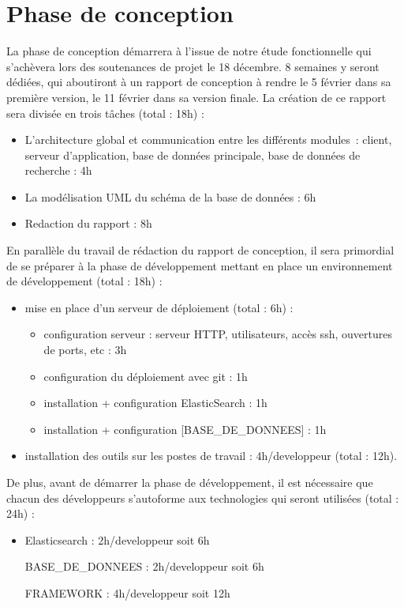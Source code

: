 \section{Phase de conception}

	La phase de conception démarrera à l'issue de notre étude fonctionnelle qui s'achèvera lors des soutenances de projet le 18 décembre.  8 semaines y seront dédiées, qui aboutiront à un rapport de conception à rendre le 5 février dans sa première version, le 11 février dans sa version finale. La création de ce rapport sera divisée en trois tâches (total : 18h) :
\begin{itemize}
\item L'architecture global et communication entre les différents modules : client, serveur d'application, base de données principale, base de données de recherche : 4h
\item La modélisation UML du schéma de la base de données : 6h
\item Redaction du rapport : 8h
\end{itemize}

	En parallèle du travail de rédaction du rapport de conception, il sera primordial de se préparer à la phase de développement mettant en place un environnement de développement (total : 18h) :
\begin{itemize}
\item mise en place d'un serveur de déploiement (total : 6h) :
	\begin{itemize}
	\item configuration serveur : serveur HTTP, utilisateurs, accès ssh, ouvertures de ports, etc : 3h
	\item configuration du déploiement avec git : 1h
	\item installation + configuration ElasticSearch : 1h
	\item installation + configuration [BASE_DE_DONNEES] : 1h
	\end{itemize}
\item installation des outils sur les postes de travail : 4h/developpeur (total : 12h).
\end{itemize}

De plus, avant de démarrer la phase de développement, il est nécessaire que chacun des développeurs s'autoforme aux technologies qui seront utilisées (total : 24h) :
\begin{itemize}
\item Elasticsearch : 2h/developpeur soit 6h
\item [BASE_DE_DONNEES] : 2h/developpeur soit 6h
\item [FRAMEWORK] : 4h/developpeur soit 12h
\end{itemize}

